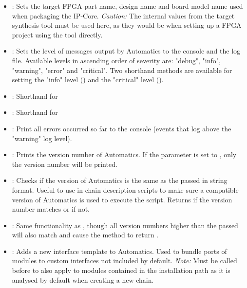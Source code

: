 \begin{itemize}
\item {}: Sets the target FPGA part name, design name and board model name used when packaging the \asterics IP-Core. \emph{Caution:} The internal values from the target synthesis tool must be used here, as they would be when setting up a FPGA project using the tool directly.
\item {}: Sets the level of messages output by Automatics to the console and the log file. Available levels in ascending order of severity are: "debug", "info", "warning", "error" and "critical". Two shorthand methods are available for setting the "info" level () and the "critical" level ().
\item {}: Shorthand for 
\item {}: Shorthand for 
\item {}: Print all errors occurred so far to the console (events that log above the "warning" log level).
\item {}: Prints the version number of Automatics. If the parameter  is set to , only the version number will be printed.
\item {}: Checks if the version of Automatics is the same as the passed  in string format. Useful to use in chain description scripts to make sure a compatible version of Automatics is used to execute the script. Returns  if the version number matches or  if not.
\item {}: Same functionality as , though all version numbers higher than the passed  will also match and cause the method to return .
\item {}: Adds a new interface template to Automatics. Used to bundle ports of modules to custom interfaces not included by default. \emph{Note:} Must be called before  to also apply to modules contained in the \asterics installation path as it is analysed by default when creating a new chain.
\end{itemize}

